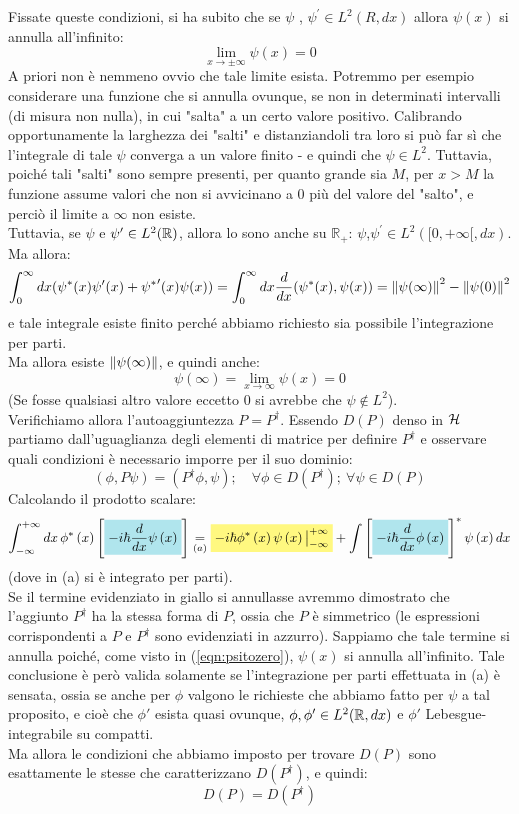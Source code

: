 \documentclass[../../FisicaTeorica.tex]{subfiles}
\begin{document}
Fissate queste condizioni, si ha subito che se $\psi$ , $\psi^\prime\in L^2(R, dx)$ allora $\psi(x)$ si annulla all'infinito:
\[
\lim_{x\rightarrow\pm\infty}{\psi\left(x\right)}=0
\]
A priori non è nemmeno ovvio che tale limite esista. Potremmo per esempio considerare una funzione che si annulla ovunque, se non in determinati intervalli (di misura non nulla), in cui "salta" a un certo valore positivo. Calibrando opportunamente la larghezza dei "salti" e distanziandoli tra loro si può far sì che l'integrale di tale $\psi$ converga a un valore finito - e quindi che $\psi \in L^2$. Tuttavia, poiché tali "salti" sono sempre presenti, per quanto grande sia $M$, per $x>M$ la funzione assume valori che non si avvicinano a $0$ più del valore del "salto", e perciò il limite a $\infty$ non esiste.\\
Tuttavia, se $\psi$ e $\psi' \in L^2(\mathbb{R})$, allora lo sono anche su $\mathbb{R}_+$: $\psi$,$\psi^\prime\in L^2([0, +\infty [, dx)$. Ma allora:
\[
\int_0^\infty dx (\psi^*(x)\psi'(x)+{\psi^*}'(x)\psi(x)) = \int_0^\infty dx \frac{d}{dx}(\psi^*(x), \psi(x)) = \left\lVert\psi(\infty)\right\rVert^2 - \left\lVert\psi(0)\right\rVert^2
\]
e tale integrale esiste finito perché abbiamo richiesto sia possibile l'integrazione per parti.\\
Ma allora esiste $\left\lVert\psi(\infty)\right\rVert$, e quindi anche:
\begin{equation}
\psi(\infty) = \lim_{x\to\infty} \psi(x) = 0
\label{eqn:psitozero}
\end{equation}
(Se fosse qualsiasi altro valore eccetto $0$ si avrebbe che $\psi \notin L^2$).\\

Verifichiamo allora l'autoaggiuntezza $P = P^\dag$. Essendo $D(P)$ denso in $\mathcal{H}$ partiamo dall'uguaglianza degli elementi di matrice per definire $P^\dag$ e osservare quali condizioni è necessario imporre per il suo dominio:
\[
\left(\phi,P\psi\right)=(P^\dag\phi,\psi); \quad \forall \phi \in D(P^\dag);\> \forall \psi \in D(P)
\]
Calcolando il prodotto scalare:
\[
\int_{-\infty}^{+\infty}{dx\,\phi^\ast\left(x\right)\left[\hlc{SkyBlue}{-i\hbar\frac{d}{dx}\psi\left(x\right)}\right]\underset{(a)}{=}
\hlc{Yellow}{-i\hbar\phi^\ast\left(x\right)\psi\left(x\right)\big|_{-\infty}^{+\infty}}+\int{\left[\hlc{SkyBlue}{-i\hbar\frac{d}{dx}\phi\left(x\right)}\right]^\ast\psi\left(x\right)dx}}
\]
(dove in (a) si è integrato per parti).\\
Se il termine evidenziato in giallo si annullasse avremmo dimostrato che l'aggiunto $P^\dag$ ha la stessa forma di $P$, ossia che $P$ è simmetrico (le espressioni corrispondenti a $P$ e $P^\dag$ sono evidenziati in azzurro). Sappiamo che tale termine si annulla poiché, come visto in (\ref{eqn:psitozero}), $\psi(x)$ si annulla all'infinito. Tale conclusione è però valida solamente se l'integrazione per parti effettuata in (a) è sensata, ossia se anche per $\phi$ valgono le richieste che abbiamo fatto per $\psi$ a tal proposito, e cioè che $\phi'$ esista quasi ovunque, $\phi, \phi' \in L^2(\mathbb{R},dx)$ e $\phi'$ Lebesgue-integrabile su compatti.\\
Ma allora le condizioni che abbiamo imposto per trovare $D(P)$ sono esattamente le stesse che caratterizzano $D\left(P^\dag\right)$, e quindi:
\[
D\left(P\right)=D(P^\dag)
\]
\end{document}
